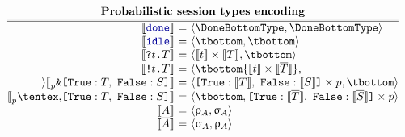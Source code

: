 \begin{center}
$\displaystyle
  \begin{array}{@{}c@{}}
    \textbf{Probabilistic session types encoding} \\
    \hline
    \hline
    \begin{array}[t]{@{}r@{~}c@{~}l@{}}
      \encfun\Done
      & = &
      \tsession\DoneBottomType\DoneBottomType
      \\
      \encfun\Idle
      & = &
      \tsession\tbottom\tbottom
      \\
      \encfun{\In\Type\SessionType}
      & = &
      \tsession{\encfun\Type\tmul\encfun\SessionType}\tbottom
      \\
      \encfun{\Out\Type\SessionType}
      & = &
      \tsession\tbottom{\encfun\Type\tmul\encfun{\dual\SessionType}}
      \\
      \encfun{\BinaryPBranch[p]{\SessionTypeT}{\SessionTypeS}}
      & = &
      \tsession{\BinaryLabels{\encfun{\SessionTypeT}}{\encfun{\SessionTypeS}}\tmul p}\tbottom
      \\
      \encfun{\BinaryPChoice[p]{\SessionTypeT}{\SessionTypeS}}
      & = &
      \tsession{\tbottom}{\BinaryLabels{\encfun{\dual\SessionTypeT}}{\encfun{\dual\SessionTypeS}}\tmul p}
      \\
      \encfun\etvar
      & = &
      \tsession{\renc\etvar}{\senc\etvar}
      \\
      \encfun{\sdual\etvar}
      & = &
      \tsession{\senc\etvar}{\renc\etvar}
    \end{array}
  \end{array}
$
\end{center}

